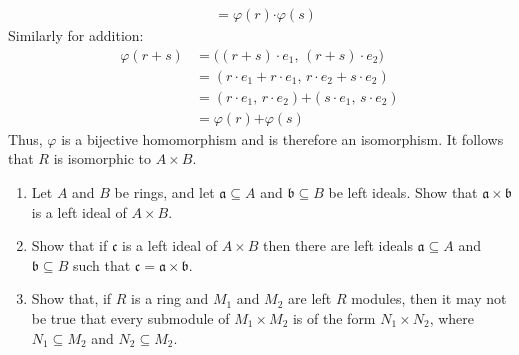\documentclass[crop=false,class=article]{standalone}                           %
\begin{document}
\begin{solution}
\begin{subequations}
\begin{align}
                    &=\varphi(r)\boldsymbol{\cdot}\varphi(s)
                \end{align}
            \end{subequations}
            Similarly for addition:
            \begin{subequations}
                \begin{align}
                    \varphi(r+s)
                    &=\big((r+s)\cdot{e}_{1},\,
                           (r+s)\cdot{e}_{2}\big)\\
                    &=(r\cdot{e}_{1}+r\cdot{e}_{1},\,
                       r\cdot{e}_{2}+s\cdot{e}_{2})\\
                    &=(r\cdot{e}_{1},\,r\cdot{e}_{2})\boldsymbol{+}
                      (s\cdot{e}_{1},\,s\cdot{e}_{2})\\
                    &=\varphi(r)\boldsymbol{+}\varphi(s)
                \end{align}
            \end{subequations}
            Thus, $\varphi$ is a bijective homomorphism and is therefore
            an isomorphism. It follows that $R$ is isomorphic to
            $A\times{B}$.
        \end{solution}
        \begin{problem}
            \par\hfill\par
            \begin{enumerate}
                \item   Let $A$ and $B$ be rings, and let
                        $\mathfrak{a}\subseteq{A}$ and
                        $\mathfrak{b}\subseteq{B}$ be left ideals.
                        Show that $\mathfrak{a}\times\mathfrak{b}$ is a
                        left ideal of $A\times{B}$.
                \item   Show that if $\mathfrak{c}$ is a left ideal of
                        $A\times{B}$ then there are left ideals
                        $\mathfrak{a}\subseteq{A}$ and
                        $\mathfrak{b}\subseteq{B}$ such that
                        $\mathfrak{c}=\mathfrak{a}\times\mathfrak{b}$.
                \item   Show that, if $R$ is a ring and $M_{1}$ and $M_{2}$
                        are left $R$ modules, then it may not be true that
                        every submodule of $M_{1}\times{M}_{2}$ is of the
                        form $N_{1}\times{N}_{2}$, where
                        $N_{1}\subseteq{M}_{2}$ and $N_{2}\subseteq{M}_{2}$.
            \end{enumerate}
        \end{problem}
\end{document}
